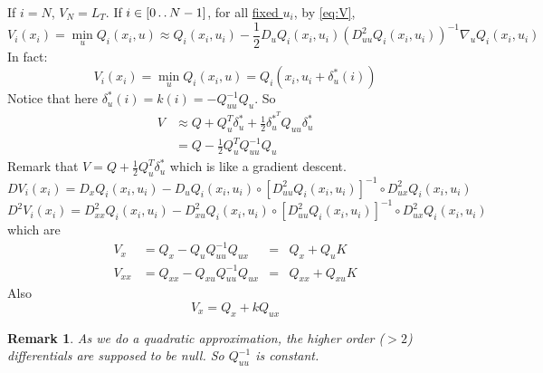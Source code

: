 \documentclass{report}
\newtheorem*{remark}{Remark}
\newcommand{\twodots}{\mathinner {\ldotp \ldotp}}
\begin{document}
If $i = N$, $V_N = L_T$. If $i \in [0\twodots N-1]$, for all \underline{fixed $u_i$}, by \ref{eq:V}, 
\begin{equation}
\label{V approx}
V_i(x_i) =\min_u Q_i(x_i,u) \approx Q_i(x_i, u_i) - \frac{1}{2} D_u Q_i (x_i, u_i) (D_{uu}^2 Q_i (x_i, u_i))^{-1} \nabla_u Q_i (x_i, u_i)
\end{equation}
In fact:
\begin{equation}
V_i(x_i) = \min_u Q_i(x_i,u) = Q_i(x_i,u_i + \delta_u^*(i)) 
\end{equation}
Notice that here $\delta_u^*(i) = k(i) = - Q_{uu}^{-1} Q_u$. So
\begin{equation}
\begin{split}
V &\approx Q + Q_u^T \delta_u^* + \frac{1}{2} \delta_u^{*^T} Q_{uu} \delta_u^* \\
& = Q - \frac{1}{2} Q_u^T Q_{uu}^{-1} Q_u 
\end{split}
\end{equation}
Remark that $V = Q + \frac{1}{2} Q_u^T \delta_u^*$ which is like a gradient descent.
\begin{equation}
    DV_i(x_i)  = D_x Q_i(x_i,u_i) - D_u Q_i (x_i, u_i) \circ [D_{uu}^2 Q_i (x_i, u_i)]^{-1} \circ D_{ux}^2 Q_i (x_i,u_i)
\end{equation}
\begin{equation}
    D^2 V_i(x_i) = D_{xx}^2 Q_i(x_i, u_i) - D_{xu}^2 Q_i (x_i,u_i) \circ [D_{uu}^2 Q_i (x_i, u_i)]^{-1} \circ D_{ux}^2 Q_i (x_i,u_i)
\end{equation}
which are
\begin{equation}
\label{VfromQ}
\begin{aligned}
V_x &= Q_x - Q_u Q_{uu}^{-1} Q_{ux} &=& Q_x + Q_u K \\
V_{xx} &= Q_{xx} - Q_{xu} Q_{uu}^{-1} Q_{ux} &=& Q_{xx} + Q_{xu} K
\end{aligned}
\end{equation}
Also
\begin{equation}
 V_x = Q_x + k Q_{ux}
\end{equation}
\begin{remark}
As we do a quadratic approximation, the higher order ($>2$) differentials are supposed to be null. So $Q_{uu}^{-1}$ is constant.
\end{remark}
\end{document}
